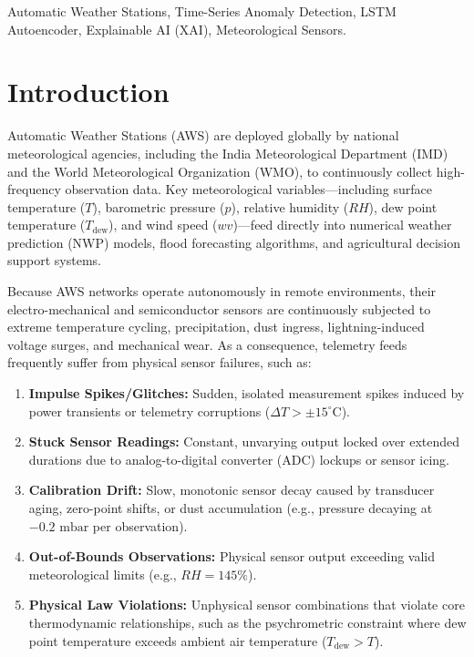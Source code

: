 \documentclass[conference]{IEEEtran}
\begin{document}
\begin{IEEEkeywords}
Automatic Weather Stations, Time-Series Anomaly Detection, LSTM Autoencoder, Explainable AI (XAI), Meteorological Sensors.
\end{IEEEkeywords}

\section{Introduction}
Automatic Weather Stations (AWS) are deployed globally by national meteorological agencies, including the India Meteorological Department (IMD) and the World Meteorological Organization (WMO), to continuously collect high-frequency observation data. Key meteorological variables—including surface temperature ($T$), barometric pressure ($p$), relative humidity ($RH$), dew point temperature ($T_{\text{dew}}$), and wind speed ($wv$)—feed directly into numerical weather prediction (NWP) models, flood forecasting algorithms, and agricultural decision support systems. 

Because AWS networks operate autonomously in remote environments, their electro-mechanical and semiconductor sensors are continuously subjected to extreme temperature cycling, precipitation, dust ingress, lightning-induced voltage surges, and mechanical wear. As a consequence, telemetry feeds frequently suffer from physical sensor failures, such as:
\begin{enumerate}
    \item \textbf{Impulse Spikes/Glitches:} Sudden, isolated measurement spikes induced by power transients or telemetry corruptions ($\Delta T > \pm 15^\circ\text{C}$).
    \item \textbf{Stuck Sensor Readings:} Constant, unvarying output locked over extended durations due to analog-to-digital converter (ADC) lockups or sensor icing.
    \item \textbf{Calibration Drift:} Slow, monotonic sensor decay caused by transducer aging, zero-point shifts, or dust accumulation (e.g., pressure decaying at $-0.2\text{ mbar}$ per observation).
    \item \textbf{Out-of-Bounds Observations:} Physical sensor output exceeding valid meteorological limits (e.g., $RH = 145\%$).
    \item \textbf{Physical Law Violations:} Unphysical sensor combinations that violate core thermodynamic relationships, such as the psychrometric constraint where dew point temperature exceeds ambient air temperature ($T_{\text{dew}} > T$).
\end{enumerate}
\end{document}
